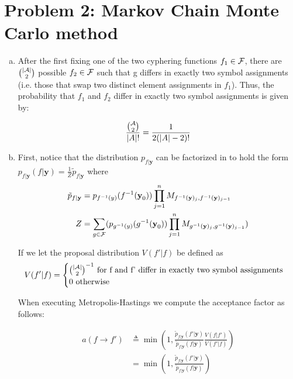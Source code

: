\documentclass{siamart190516}
\begin{document}
\section*{Problem 2: Markov Chain Monte Carlo method}
\label{sec:mcmc}
\begin{enumerate}[(a)]
  \item After the first fixing one of the two cyphering functions $f_1 \in \mathcal{F}$, there are $\binom{\left| \mathcal{A} \right|}{2}$ possible $f_2 \in \mathcal{F}$ such that g differs in exactly two symbol assignments (i.e. those that swap two distinct element assignments in $f_1$). Thus, the probability that $f_1$ and $f_2$ differ in exactly two symbol assignments is given by:

        \[
          \frac{\binom{\mathcal{A}}{2}}{\left| A \right|!} = \frac{1}{2(\left| A \right| - 2)!}
        \]

  \item First, notice that the distribution $p_{f | \textbf{y}}$ can be factorized in to hold the form $p_{f | \textbf{y}}(f | \textbf{y}) = \frac{1}{Z}\tilde{p}_{f | \textbf{y}}$ where
        \begin{align*}
          \tilde{p}_{f | \textbf{y}} & = p_{f^{-1}(y)}(f^{-1}(\textbf{y}_0)) \prod_{j = 1}^n M_{f^{-1}(\textbf{y})_{j}, f^{-1}(\textbf{y})_{j-1}}                  \\
          Z                          & = \sum_{g \in \mathcal{F}}(p_{g^{-1}(y)}(g^{-1}(\textbf{y}_0)) \prod_{j = 1}^n M_{g^{-1}(\textbf{y})_{j}, g^{-1}(\textbf{y})_{j-1}})
        \end{align*}

        If we let the proposal distribution $V(f' | f)$ be defined as
        \[
          V(f' | f) = \begin{cases}
            \binom{\left| \mathcal{A} \right|}{2}^{-1} \text{  for f and f' differ in exactly two symbol assignments} \\
            0 \text{  otherwise}
          \end{cases}
        \]

        When executing Metropolis-Hastings we compute the acceptance factor as follows:

        \begin{align*}
          a(f \rightarrow f') & \triangleq \min(1, \frac{\tilde{p}_{f | \textbf{y}}(f' | \textbf{y})}{\tilde{p}_{f | \textbf{y}}(f | \textbf{y})} \frac{V(f | f')}{V(f' | f)}) \\
                              & =\min(1, \frac{\tilde{p}_{f | \textbf{y}}(f' | \textbf{y})}{\tilde{p}_{f | \textbf{y}}(f | \textbf{y})})
        \end{align*}


\end{enumerate}
\end{document}
